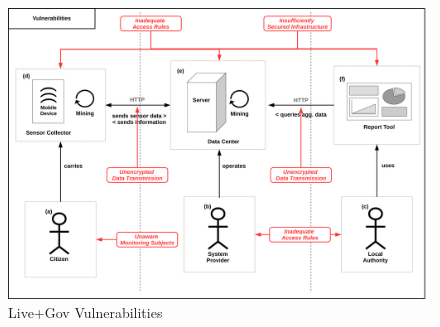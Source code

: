 \begin{figure}
\centering
\includegraphics[width=\textwidth]{diagrams/png/vulnerabilities.png}

%

\caption{Live+Gov Vulnerabilities}
\label{figure:Live+Gov Vulnerabilities}
\end{figure}
